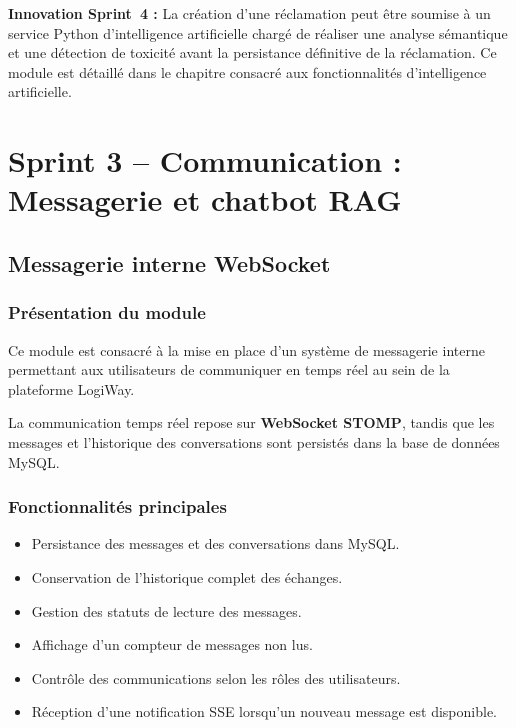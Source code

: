 \documentclass[12pt,a4paper]{report}
\begin{document}
\begin{tcolorbox}[ruleframe]
  \textbf{Innovation Sprint~4 :} La création d'une réclamation peut être
  soumise à un service Python d'intelligence artificielle chargé de réaliser
  une analyse sémantique et une détection de toxicité avant la persistance
  définitive de la réclamation. Ce module est détaillé dans le chapitre
  consacré aux fonctionnalités d'intelligence artificielle.
\end{tcolorbox}



\section{Sprint 3 -- Communication : Messagerie et chatbot RAG}
\label{sec:ch3-sprint3-comm}

\subsection{Messagerie interne WebSocket}
\label{sec:ch3-sprint7}

\subsubsection{Présentation du module}

Ce module est consacré à la mise en place d'un système de
messagerie interne permettant aux utilisateurs de communiquer en temps
réel au sein de la plateforme LogiWay.

La communication temps réel repose sur \textbf{WebSocket STOMP}, tandis
que les messages et l'historique des conversations sont persistés dans
la base de données MySQL.

\subsubsection{Fonctionnalités principales}

\begin{itemize}
  \item Persistance des messages et des conversations dans MySQL.
  
  \item Conservation de l'historique complet des échanges.
  
  \item Gestion des statuts de lecture des messages.
  
  \item Affichage d'un compteur de messages non lus.
  
  \item Contrôle des communications selon les rôles des utilisateurs.
  
  \item Réception d'une notification SSE lorsqu'un nouveau message
  est disponible.
\end{itemize}
\end{document}
